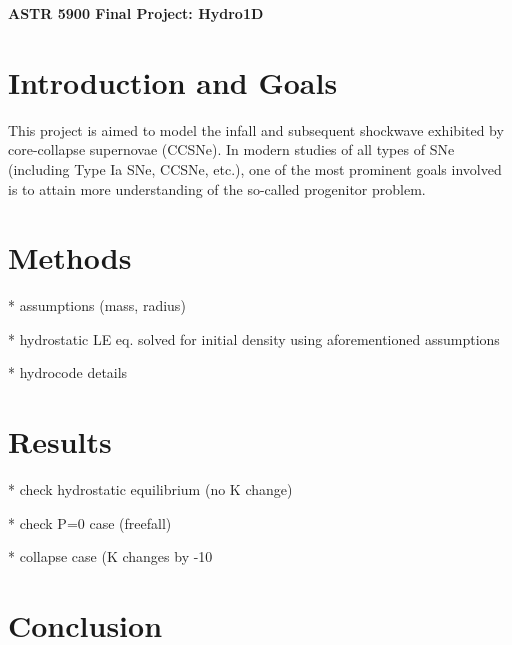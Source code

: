 \documentclass[12pt]{article}
\begin{document}
\begin{center}\begin{LARGE}
\textbf{ASTR 5900 Final Project: Hydro1D}
\end{LARGE}\end{center}

\section{Introduction and Goals}

This project is aimed to model the infall and subsequent shockwave exhibited by
core-collapse supernovae (CCSNe). In modern studies of all types of SNe
(including Type Ia SNe, CCSNe, etc.), one of the most prominent goals involved
is to attain more understanding of the so-called progenitor problem.

\section{Methods}

* assumptions (mass, radius)

* hydrostatic LE eq. solved for initial density using aforementioned assumptions

* hydrocode details

\section{Results}

* check hydrostatic equilibrium (no K change)

* check P=0 case (freefall)

* collapse case (K changes by -10%

\section{Conclusion}
\end{document}
